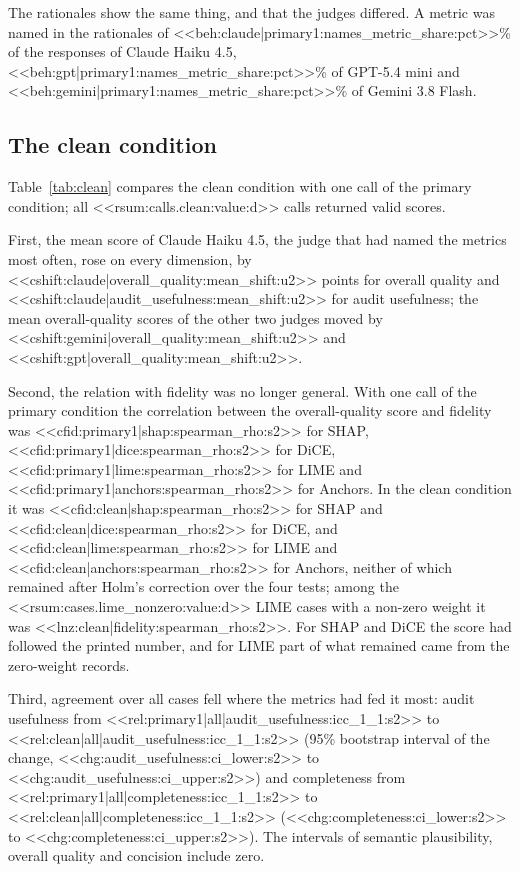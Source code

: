 \documentclass[12pt,letterpaper]{article}
\begin{document}
The rationales show the same thing, and that the judges differed. A metric
was named in the rationales of
<<beh:claude|primary1:names_metric_share:pct>>\% of the responses of Claude Haiku 4.5,
<<beh:gpt|primary1:names_metric_share:pct>>\% of GPT-5.4 mini and
<<beh:gemini|primary1:names_metric_share:pct>>\% of Gemini 3.8 Flash.

\subsection{The clean condition}

Table~\ref{tab:clean} compares the clean condition with one call of the primary
condition; all <<rsum:calls.clean:value:d>> calls returned valid scores.

First, the mean score of Claude Haiku 4.5, the judge that had named the metrics most
often, rose on every dimension, by
<<cshift:claude|overall_quality:mean_shift:u2>> points for overall quality and
<<cshift:claude|audit_usefulness:mean_shift:u2>> for audit usefulness; the mean
overall-quality scores of the other two judges moved by
<<cshift:gemini|overall_quality:mean_shift:u2>> and
<<cshift:gpt|overall_quality:mean_shift:u2>>.

Second, the relation with fidelity was no longer general. With one call of the primary
condition the correlation between the overall-quality score and fidelity was
<<cfid:primary1|shap:spearman_rho:s2>> for SHAP, <<cfid:primary1|dice:spearman_rho:s2>>
for DiCE, <<cfid:primary1|lime:spearman_rho:s2>> for LIME and
<<cfid:primary1|anchors:spearman_rho:s2>> for Anchors. In the clean condition it was
<<cfid:clean|shap:spearman_rho:s2>> for SHAP and <<cfid:clean|dice:spearman_rho:s2>> for
DiCE, and <<cfid:clean|lime:spearman_rho:s2>> for LIME and
<<cfid:clean|anchors:spearman_rho:s2>> for Anchors, neither of which remained after
Holm's correction over the four tests; among the <<rsum:cases.lime_nonzero:value:d>>
LIME cases with a non-zero weight it was <<lnz:clean|fidelity:spearman_rho:s2>>. For SHAP
and DiCE the score had followed the printed number, and for LIME part of what remained
came from the zero-weight records.

Third, agreement over all cases fell where the metrics had fed it most: audit usefulness
from <<rel:primary1|all|audit_usefulness:icc_1_1:s2>> to
<<rel:clean|all|audit_usefulness:icc_1_1:s2>> (95\% bootstrap interval of the change,
<<chg:audit_usefulness:ci_lower:s2>> to
<<chg:audit_usefulness:ci_upper:s2>>) and completeness from
<<rel:primary1|all|completeness:icc_1_1:s2>> to <<rel:clean|all|completeness:icc_1_1:s2>>
(<<chg:completeness:ci_lower:s2>> to <<chg:completeness:ci_upper:s2>>). The intervals of
semantic plausibility, overall quality and concision include zero.
\end{document}
